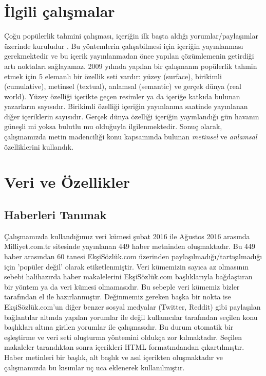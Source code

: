 \documentclass[conference]{IEEEtran}
\begin{document}
\section{\.{I}lgili \c{c}al{\i}\c{s}malar}
\c{C}o\u{g}u popülerlik tahmini \c{c}al{\i}\c{s}mas{\i}, i\c{c}eri\u{g}in ilk ba\c{s}ta ald{\i}\u{g}{\i} yorumlar/payla\c{s}{\i}mlar üzerinde kuruludur \cite{szabo_predicting_2010}. Bu yöntemlerin \c{c}al{\i}\c{s}abilmesi i\c{c}in i\c{c}eri\u{g}in yay{\i}nlanmas{\i} gerekmektedir ve bu i\c{c}erik yay{\i}nlanmadan önce yap{\i}lan \c{c}özümlemenin getirdi\u{g}i art{\i} noktalar{\i} sa\u{g}layamaz.
2009 y{\i}l{\i}nda yap{\i}lan bir \c{c}al{\i}\c{s}man{\i}n \cite{tsagkias_predicting_2009} popülerlik tahmin etmek i\c{c}in 5 elemanl{\i} bir özellik seti vard{\i}r: yüzey (surface), birikimli (cumulative), metinsel (textual), anlamsal (semantic) ve ger\c{c}ek dünya (real world). Yüzey özelli\u{g}i i\c{c}erikte ge\c{c}en resimler ya da i\c{c}eri\u{g}e katk{\i}da bulunan yazarlar{\i}n say{\i}s{\i}d{\i}r. Birikimli özelli\u{g}i i\c{c}eri\u{g}in yay{\i}nlanma saatinde yay{\i}nlanan di\u{g}er i\c{c}eriklerin say{\i}s{\i}d{\i}r. Ger\c{c}ek dünya özelli\u{g}i i\c{c}eri\u{g}in yay{\i}nland{\i}\u{g}{\i} gün havan{\i}n güne\c{s}li mi yoksa bulutlu mu oldu\u{g}uyla ilgilenmektedir. Sonu\c{c} olarak, \c{c}al{\i}\c{s}mam{\i}zda metin madencili\u{g}i konu kapsam{\i}nda bulunan \emph{metinsel} ve \emph{anlamsal} özelliklerini kulland{\i}k.

\section{Veri ve Özellikler}
\subsection{Haberleri Tan{\i}mak}
\c{C}al{\i}\c{s}mam{\i}zda kulland{\i}\u{g}{\i}m{\i}z veri kümesi \c{s}ubat 2016 ile A\u{g}ustos 2016 aras{\i}nda Milliyet.com.tr sitesinde yay{\i}nlanan 449 haber metninden olu\c{s}maktad{\i}r. Bu 449 haber aras{\i}ndan 60 tanesi Ek\c{s}iSözlük.com üzerinden payla\c{s}{\i}lmad{\i}\u{g}{\i}/tart{\i}\c{s}{\i}lmad{\i}\u{g}{\i} i\c{c}in 'popüler de\u{g}il' olarak etiketlenmi\c{s}tir. Veri kümemizin say{\i}ca az olmas{\i}n{\i}n sebebi halihaz{\i}rda haber makalelerini Ek\c{s}iSözlük.com ba\c{s}l{\i}klar{\i}yla ba\u{g}da\c{s}t{\i}ran bir yöntem ya da veri kümesi olmamas{\i}d{\i}r. Bu sebeple veri kümemiz bizler taraf{\i}ndan el ile haz{\i}rlanm{\i}\c{s}t{\i}r. De\u{g}inmemiz gereken ba\c{s}ka bir nokta ise Ek\c{s}iSözlük.com'un di\u{g}er benzer sosyal medyalar (Twitter, Reddit) gibi payla\c{s}{\i}lan ba\u{g}lant{\i}lar alt{\i}nda yap{\i}lan yorumlar ile de\u{g}il kullan{\i}c{\i}lar taraf{\i}ndan se\c{c}ilen konu ba\c{s}l{\i}klar{\i} alt{\i}na girilen yorumlar ile \c{c}al{\i}\c{s}mas{\i}d{\i}r. Bu durum otomatik bir e\c{s}le\c{s}tirme ve veri seti olu\c{s}turma yöntemini olduk\c{c}a zor k{\i}lmaktad{\i}r. Se\c{c}ilen makaleler tarand{\i}ktan sonra i\c{c}erikleri HTML format{\i}ndandan \c{c}{\i}kart{\i}lm{\i}\c{s}t{\i}r. Haber metinleri bir ba\c{s}l{\i}k, alt ba\c{s}l{\i}k ve as{\i}l i\c{c}erikten olu\c{s}maktad{\i}r ve \c{c}al{\i}\c{s}mam{\i}zda bu k{\i}s{\i}mlar u\c{c} uca eklenerek kullan{\i}lm{\i}\c{s}t{\i}r.
\end{document}
